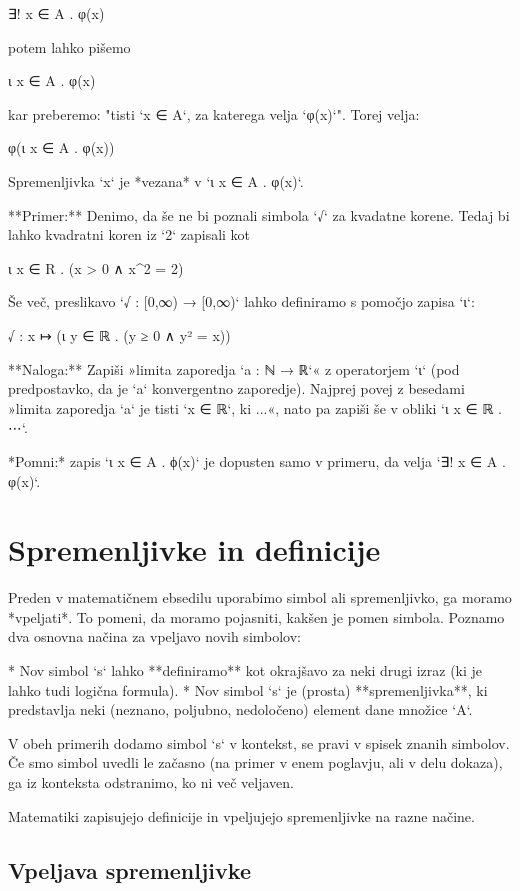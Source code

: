     ∃! x ∈ A . φ(x)

potem lahko pišemo

    ι x ∈ A . φ(x)

kar preberemo: "tisti `x ∈ A`, za katerega velja `φ(x)`". Torej velja:

    φ(ι x ∈ A . φ(x))

Spremenljivka `x` je *vezana* v `ι x ∈ A . φ(x)`.


**Primer:** Denimo, da še ne bi poznali simbola `√` za kvadatne korene. Tedaj bi
lahko kvadratni koren iz `2` zapisali kot

    ι x ∈ R . (x > 0 ∧ x^2 = 2)

Še več, preslikavo `√ : [0,∞) → [0,∞)` lahko definiramo s pomočjo zapisa `ι`:

    √ : x ↦ (ι y ∈ ℝ . (y ≥ 0 ∧ y² = x))


**Naloga:** Zapiši »limita zaporedja `a : ℕ → ℝ`« z operatorjem `ι` (pod predpostavko, da je `a` konvergentno
zaporedje). Najprej povej z besedami »limita zaporedja `a` je tisti `x ∈ ℝ`, ki ...«, nato pa zapiši še v obliki `ι x ∈ ℝ . ⋯`.

*Pomni:* zapis `ι x ∈ A . ϕ(x)` je dopusten samo v primeru, da velja `∃! x ∈ A . φ(x)`.


\chapter{Spremenljivke in definicije}


Preden v matematičnem ebsedilu uporabimo simbol ali spremenljivko, ga moramo *vpeljati*. To pomeni, da moramo pojasniti, kakšen je pomen simbola. Poznamo dva osnovna načina za vpeljavo novih simbolov:

* Nov simbol `s` lahko **definiramo** kot okrajšavo za neki drugi izraz (ki je lahko tudi logična formula).
* Nov simbol `s` je (prosta) **spremenljivka**, ki predstavlja neki (neznano, poljubno, nedoločeno) element dane množice `A`.

V obeh primerih dodamo simbol `s` v kontekst, se pravi v spisek znanih simbolov. Če smo simbol uvedli le začasno (na
primer v enem poglavju, ali v delu dokaza), ga iz konteksta odstranimo, ko ni več veljaven.

Matematiki zapisujejo definicije in vpeljujejo spremenljivke na razne načine.

\section{Vpeljava spremenljivke}

